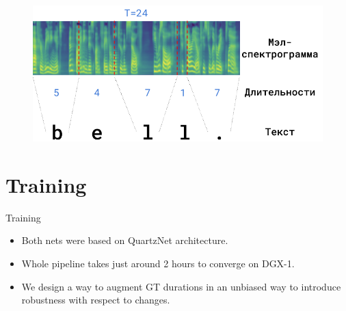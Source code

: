 \begin{frame}
\begin{figure}[H]
\centering
\includegraphics[width=1.0\textwidth]{images/alignment.png}
\end{figure}
\end{frame}

\section{Training}

\begin{frame}{Training}
\begin{itemize}
    \item Both nets were based on QuartzNet architecture.
    \item Whole pipeline takes just around 2 hours to converge on DGX-1.
    \item We design a way to augment GT durations in an unbiased way to introduce robustness with respect to changes.
\end{itemize}
\end{frame}

\begin{frame}
\begin{table}[ht!]
\centering
{}
\caption{Grapheme duration predictor based on QuartzNet 5x5. It takes just around 15 minutes for net to converge on LJSpeech data on DGX-1.}
\end{table}
\end{frame}

